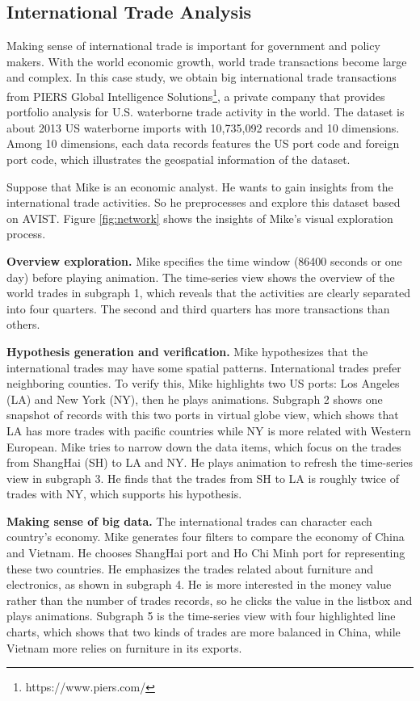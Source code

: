\subsection{International Trade Analysis}


Making sense of international trade is important for government and policy makers. With the world economic growth, world trade transactions become large and complex. In this case study, we obtain big international trade transactions from PIERS Global Intelligence Solutions\footnote{https://www.piers.com/}, a private company that provides portfolio analysis for U.S. waterborne trade activity in the world. The dataset is about 2013 US waterborne imports with 10,735,092 records and 10 dimensions. Among 10 dimensions, each data records features the US port code and foreign port code, which illustrates the geospatial information of the dataset.

Suppose that Mike is an economic analyst. He wants to gain insights from the international trade activities. So he  preprocesses and explore this dataset based on AVIST. Figure \ref{fig:network} shows the insights of Mike's visual exploration process.

 
\textbf{Overview exploration.} Mike specifies the time window (86400 seconds or one day) before playing animation. The time-series view shows the overview of the world trades in subgraph 1, which reveals that the activities are clearly separated into four quarters. The second and third quarters has more transactions than others.


\textbf{Hypothesis generation and verification.}
Mike hypothesizes that the international trades may have some spatial patterns. International trades prefer neighboring counties. To verify this, Mike highlights two US ports: Los Angeles (LA) and New York (NY), then he plays animations.
Subgraph 2 shows one snapshot of records with this two ports in virtual globe view, which shows that LA has more trades with pacific countries while NY is more related with Western European. Mike tries to narrow down the data items, which focus on the trades from ShangHai (SH) to LA and NY. He plays animation to refresh the time-series view in subgraph 3. He finds that the trades from SH to LA is roughly twice of trades with NY, which supports  his hypothesis. 

\textbf{Making sense of big data. }
The international trades can character each country's economy. Mike generates four filters to compare the economy of China and Vietnam. He chooses ShangHai port and Ho Chi Minh port for representing these two countries. He emphasizes the trades related about furniture and electronics, as shown in subgraph 4. He is more interested in the money value rather than the number of trades records, so he clicks the value in the listbox and plays animations. Subgraph 5 is the time-series view with four highlighted line charts, which shows that two kinds of trades are more balanced in China, while Vietnam more relies on furniture in its exports. 

